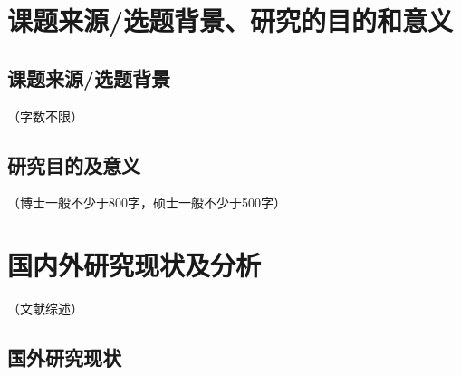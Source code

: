 \documentclass{SYSUReport}
\date{\today}
\begin{document}
\cover
\thispagestyle{empty} %
\clearpage

%
%


\setcounter{page}{1}
\tableofcontents
\clearpage

\setcounter{page}{1}


\section{课题来源/选题背景、研究的目的和意义}

\subsection{课题来源/选题背景}

（字数不限）

\subsection{研究目的及意义}

（博士一般不少于800字，硕士一般不少于500字）





\section{国内外研究现状及分析}

（文献综述）

\subsection{国外研究现状}
\end{document}
